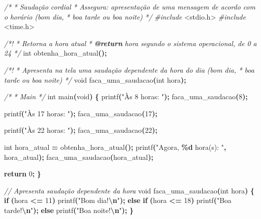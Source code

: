 \documentclass[
  11pt,
  a4paper,
]{scrbook}
\newenvironment{Shaded}{\begin{snugshade}}{\end{snugshade}}
\newcommand{\AnnotationTok}[1]{\textcolor[rgb]{0.56,0.35,0.01}{\textbf{\textit{#1}}}}
\newcommand{\CommentTok}[1]{\textcolor[rgb]{0.56,0.35,0.01}{\textit{#1}}}
\newcommand{\ControlFlowTok}[1]{\textcolor[rgb]{0.13,0.29,0.53}{\textbf{#1}}}
\newcommand{\DataTypeTok}[1]{\textcolor[rgb]{0.13,0.29,0.53}{#1}}
\newcommand{\DecValTok}[1]{\textcolor[rgb]{0.00,0.00,0.81}{#1}}
\newcommand{\ImportTok}[1]{#1}
\newcommand{\NormalTok}[1]{#1}
\newcommand{\OperatorTok}[1]{\textcolor[rgb]{0.81,0.36,0.00}{\textbf{#1}}}
\newcommand{\PreprocessorTok}[1]{\textcolor[rgb]{0.56,0.35,0.01}{\textit{#1}}}
\newcommand{\SpecialCharTok}[1]{\textcolor[rgb]{0.81,0.36,0.00}{\textbf{#1}}}
\newcommand{\StringTok}[1]{\textcolor[rgb]{0.31,0.60,0.02}{#1}}
\begin{document}
\begin{Shaded}
\begin{Highlighting}[]
\CommentTok{/*}
\CommentTok{ * Saudação cordial}
\CommentTok{ * Assegura: apresentação de uma mensagem de acordo com o horário (bom dia,}
\CommentTok{ *  boa tarde ou boa noite)}
\CommentTok{ */}
\PreprocessorTok{\#include }\ImportTok{\textless{}stdio.h\textgreater{}}
\PreprocessorTok{\#include }\ImportTok{\textless{}time.h\textgreater{}}

\CommentTok{/*!}
\CommentTok{ * Retorna a hora atual}
\CommentTok{ * }\AnnotationTok{@return}\CommentTok{ hora segundo o sistema operacional, de 0 a 24}
\CommentTok{ */}
\DataTypeTok{int}\NormalTok{ obtenha\_hora\_atual}\OperatorTok{();}

\CommentTok{/*!}
\CommentTok{ * Apresenta na tela uma saudação dependente da hora do dia (bom dia,}
\CommentTok{ *  boa tarde ou boa noite)}
\CommentTok{ */}
\DataTypeTok{void}\NormalTok{ faca\_uma\_saudacao}\OperatorTok{(}\DataTypeTok{int}\NormalTok{ hora}\OperatorTok{);}

\CommentTok{/*}
\CommentTok{ * Main}
\CommentTok{ */}
\DataTypeTok{int}\NormalTok{ main}\OperatorTok{(}\DataTypeTok{void}\OperatorTok{)} \OperatorTok{\{}
\NormalTok{    printf}\OperatorTok{(}\StringTok{"Às 8 horas: "}\OperatorTok{);}
\NormalTok{    faca\_uma\_saudacao}\OperatorTok{(}\DecValTok{8}\OperatorTok{);}

\NormalTok{    printf}\OperatorTok{(}\StringTok{"Às 17 horas: "}\OperatorTok{);}
\NormalTok{    faca\_uma\_saudacao}\OperatorTok{(}\DecValTok{17}\OperatorTok{);}

\NormalTok{    printf}\OperatorTok{(}\StringTok{"Às 22 horas: "}\OperatorTok{);}
\NormalTok{    faca\_uma\_saudacao}\OperatorTok{(}\DecValTok{22}\OperatorTok{);}

    \DataTypeTok{int}\NormalTok{ hora\_atual }\OperatorTok{=}\NormalTok{ obtenha\_hora\_atual}\OperatorTok{();}
\NormalTok{    printf}\OperatorTok{(}\StringTok{"Agora, }\SpecialCharTok{\%d}\StringTok{ hora(s): "}\OperatorTok{,}\NormalTok{ hora\_atual}\OperatorTok{);}
\NormalTok{    faca\_uma\_saudacao}\OperatorTok{(}\NormalTok{hora\_atual}\OperatorTok{);}

    \ControlFlowTok{return} \DecValTok{0}\OperatorTok{;}
\OperatorTok{\}}

\CommentTok{// Apresenta saudação dependente da hora}
\DataTypeTok{void}\NormalTok{ faca\_uma\_saudacao}\OperatorTok{(}\DataTypeTok{int}\NormalTok{ hora}\OperatorTok{)} \OperatorTok{\{}
    \ControlFlowTok{if} \OperatorTok{(}\NormalTok{hora }\OperatorTok{\textless{}=} \DecValTok{11}\OperatorTok{)}
\NormalTok{        printf}\OperatorTok{(}\StringTok{"Bom dia!}\SpecialCharTok{\textbackslash{}n}\StringTok{"}\OperatorTok{);}
    \ControlFlowTok{else} \ControlFlowTok{if} \OperatorTok{(}\NormalTok{hora }\OperatorTok{\textless{}=} \DecValTok{18}\OperatorTok{)}
\NormalTok{        printf}\OperatorTok{(}\StringTok{"Boa tarde!}\SpecialCharTok{\textbackslash{}n}\StringTok{"}\OperatorTok{);}
    \ControlFlowTok{else}
\NormalTok{        printf}\OperatorTok{(}\StringTok{"Boa noite!}\SpecialCharTok{\textbackslash{}n}\StringTok{"}\OperatorTok{);}
\OperatorTok{\}}


\end{Highlighting}
\end{Shaded}
\end{document}
